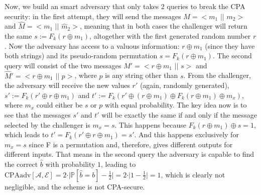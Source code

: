\documentclass{article}
\begin{document}
Now, we build an smart adversary that only takes 2 queries to break the CPA security: in the first attempt, they will send the messages $M = <m_1$ $\vert \vert$ $m_2>$ and $\hat M = <m_1$ $\vert \vert$ $\hat m_2>$, meaning that in both cases the challenger will return the same $s := F_k (r \oplus m_1)$, altogether with the first generated random number $r$. Now the adversary has access to a valuous information: $r \oplus m_1$ (since they have both strings) and its pseudo-random permutation $s = F_k (r \oplus m_1)$. The second query will consist of the two messages $M' = <r \oplus m_1$ $\vert \vert$ $s>$ and $\hat M' = <r \oplus m_1$ $\vert \vert$ $p>$, where $p$ is any string other than $s$. From the challenger, the adversary will receive the new values $r'$ (again, randomly generated), $s' := F_k(r' \oplus r \oplus m_1)$ and $t' := F_k(r' \oplus (r \oplus m_1) \oplus F_k (r \oplus m_1) \oplus m_x)$, where $m_x$ could either be $s$ or $p$ with equal probability. The key idea now is to see that the messages $s'$ and $t'$ will be exactly the same if and only if the message selected by the challenger is $m_x = s$. This happens because $F_k(r \oplus m_1) \oplus s = 1$, which leads to $t' = F_k(r' \oplus r \oplus m_1) = s'$. And this happens exclusively for $m_x = s$ since F is a permutation and, therefore, gives different outputs for different inputs. That means in the second query the adversary is capable to find the correct $\hat b$ with probability $1$, leading to $\text{CPAadv}[\mathcal{A}, \mathcal{E}] = 2 \cdot \vert \mathbb{P}[\hat{b} = b] - \frac{1}{2} \vert = 2 \cdot \vert 1 - \frac{1}{2} \vert = 1$, which is clearly not negligible, and the scheme is not CPA-secure.
\end{document}
